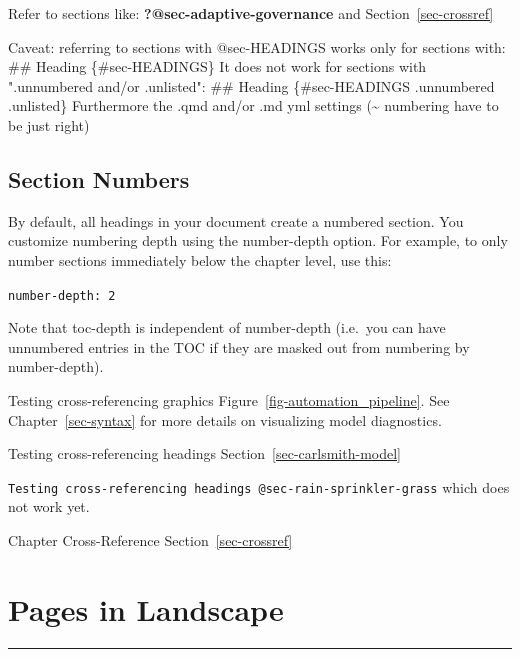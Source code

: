 \documentclass[
  11pt,
  letterpaper,
]{book}
\newenvironment{Shaded}{\begin{snugshade}}{\end{snugshade}}
\newcommand{\AnnotationTok}[1]{\textcolor[rgb]{0.37,0.37,0.37}{#1}}
\newcommand{\CommentTok}[1]{\textcolor[rgb]{0.37,0.37,0.37}{#1}}
\newcommand{\FunctionTok}[1]{\textcolor[rgb]{0.28,0.35,0.67}{#1}}
\newcommand{\NormalTok}[1]{\textcolor[rgb]{0.00,0.23,0.31}{#1}}
\begin{document}
Refer to sections like: \textbf{?@sec-adaptive-governance} and
Section~\ref{sec-crossref}

\begin{Shaded}
\begin{Highlighting}[]
\AnnotationTok{Caveat:}\CommentTok{ referring to sections with @sec{-}HEADINGS works only for sections with:}
\FunctionTok{\#\# Heading \{\#sec{-}HEADINGS\}}
\NormalTok{It does not work for sections with ".unnumbered and/or .unlisted":}
\FunctionTok{\#\# Heading \{\#sec{-}HEADINGS .unnumbered .unlisted\}}
\NormalTok{Furthermore the .qmd and/or .md yml settings (\textasciitilde{} numbering have to be just right)}
\end{Highlighting}
\end{Shaded}

\subsection{Section Numbers}\label{section-numbers-1}

By default, all headings in your document create a numbered section. You
customize numbering depth using the number-depth option. For example, to
only number sections immediately below the chapter level, use this:

\texttt{number-depth:\ 2}

Note that toc-depth is independent of number-depth (i.e.~you can have
unnumbered entries in the TOC if they are masked out from numbering by
number-depth).

Testing cross-referencing graphics Figure~\ref{fig-automation_pipeline}.
See Chapter~\ref{sec-syntax} for more details on visualizing model
diagnostics.

Testing cross-referencing headings Section~\ref{sec-carlsmith-model}

\texttt{Testing\ cross-referencing\ headings\ @sec-rain-sprinkler-grass}
which does not work yet.

Chapter Cross-Reference Section~\ref{sec-crossref}

\section{Pages in Landscape}\label{pages-in-landscape-1}

\begin{center}\rule{0.5\linewidth}{0.5pt}\end{center}

\end{document}
